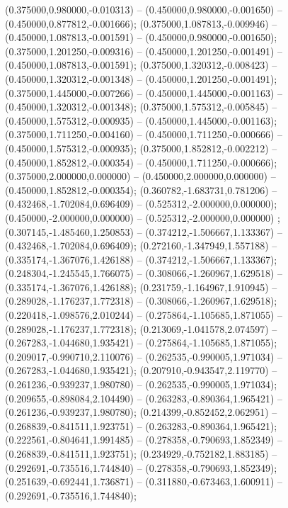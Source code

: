  (0.375000,0.980000,-0.010313) -- (0.450000,0.980000,-0.001650) -- (0.450000,0.877812,-0.001666);
 (0.375000,1.087813,-0.009946) -- (0.450000,1.087813,-0.001591) -- (0.450000,0.980000,-0.001650);
 (0.375000,1.201250,-0.009316) -- (0.450000,1.201250,-0.001491) -- (0.450000,1.087813,-0.001591);
 (0.375000,1.320312,-0.008423) -- (0.450000,1.320312,-0.001348) -- (0.450000,1.201250,-0.001491);
 (0.375000,1.445000,-0.007266) -- (0.450000,1.445000,-0.001163) -- (0.450000,1.320312,-0.001348);
 (0.375000,1.575312,-0.005845) -- (0.450000,1.575312,-0.000935) -- (0.450000,1.445000,-0.001163);
 (0.375000,1.711250,-0.004160) -- (0.450000,1.711250,-0.000666) -- (0.450000,1.575312,-0.000935);
 (0.375000,1.852812,-0.002212) -- (0.450000,1.852812,-0.000354) -- (0.450000,1.711250,-0.000666);
 (0.375000,2.000000,0.000000) -- (0.450000,2.000000,0.000000) -- (0.450000,1.852812,-0.000354);
 (0.360782,-1.683731,0.781206) -- (0.432468,-1.702084,0.696409) -- (0.525312,-2.000000,0.000000);
 (0.450000,-2.000000,0.000000) -- (0.525312,-2.000000,0.000000) ;
 (0.307145,-1.485460,1.250853) -- (0.374212,-1.506667,1.133367) -- (0.432468,-1.702084,0.696409);
 (0.272160,-1.347949,1.557188) -- (0.335174,-1.367076,1.426188) -- (0.374212,-1.506667,1.133367);
 (0.248304,-1.245545,1.766075) -- (0.308066,-1.260967,1.629518) -- (0.335174,-1.367076,1.426188);
 (0.231759,-1.164967,1.910945) -- (0.289028,-1.176237,1.772318) -- (0.308066,-1.260967,1.629518);
 (0.220418,-1.098576,2.010244) -- (0.275864,-1.105685,1.871055) -- (0.289028,-1.176237,1.772318);
 (0.213069,-1.041578,2.074597) -- (0.267283,-1.044680,1.935421) -- (0.275864,-1.105685,1.871055);
 (0.209017,-0.990710,2.110076) -- (0.262535,-0.990005,1.971034) -- (0.267283,-1.044680,1.935421);
 (0.207910,-0.943547,2.119770) -- (0.261236,-0.939237,1.980780) -- (0.262535,-0.990005,1.971034);
 (0.209655,-0.898084,2.104490) -- (0.263283,-0.890364,1.965421) -- (0.261236,-0.939237,1.980780);
 (0.214399,-0.852452,2.062951) -- (0.268839,-0.841511,1.923751) -- (0.263283,-0.890364,1.965421);
 (0.222561,-0.804641,1.991485) -- (0.278358,-0.790693,1.852349) -- (0.268839,-0.841511,1.923751);
 (0.234929,-0.752182,1.883185) -- (0.292691,-0.735516,1.744840) -- (0.278358,-0.790693,1.852349);
 (0.251639,-0.692441,1.736871) -- (0.311880,-0.673463,1.600911) -- (0.292691,-0.735516,1.744840);
